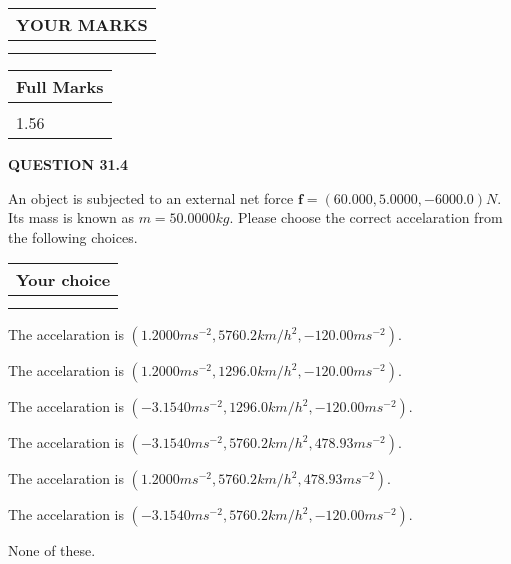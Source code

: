 \documentclass[12pt]{article}
\begin{document}
\noindent\begin{tabular}{|l|}
\hline
 YOUR MARKS  \\
\hline
 \\ 
 \\ 
\hline
\end{tabular}
\hspace{0.05in} \begin{tabular}{|l|}
\hline
 Full Marks  \\
\hline
 \\ 
1.56 \\
\hline
\end{tabular}
{\textbf{\Large{QUESTION
31.4 
}}}
  
  
 
An object is subjected to an external net force $\mathbf{f}=(
60.000 ,
5.0000,
-6000.0  )N$. Its mass is known as
$m= %
50.0000  kg$. Please choose the correct accelaration
from the following choices.
 
  
  
\noindent\hspace{3.0in} \begin{tabular}{|l|}
\hline
Your choice \\
\hline
 \\ 
 \\ 
\hline
\end{tabular}
  
  
 
 
The accelaration is
$(
1.2000ms^{-2},
5760.2km/h^2,
-120.00ms^{-2}
).
$
 
 
The accelaration is
$(
1.2000ms^{-2},
1296.0km/h^2,
-120.00ms^{-2}
).
$
 
 
The accelaration is
$(
-3.1540ms^{-2},
1296.0km/h^2,
-120.00ms^{-2}
).
$
 
 
The accelaration is
$(
-3.1540ms^{-2},
5760.2km/h^2,
478.93ms^{-2}
).
$
 
 
The accelaration is
$(
1.2000ms^{-2},
5760.2km/h^2,
478.93ms^{-2}
).
$
 
 
The accelaration is
$(
-3.1540ms^{-2},
5760.2km/h^2,
-120.00ms^{-2}
).
$
 
 
 None of these.
 
 
 
 

 
\vspace{0.3in}
  
\end{document}
